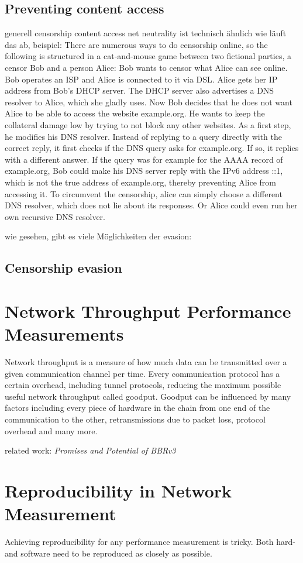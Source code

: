 \subsection{Preventing content access}
generell censorship
content access
net neutrality
ist technisch ähnlich
wie läuft das ab, beispiel:
There are numerous ways to do censorship online, so the following is structured in a cat-and-mouse game between two fictional parties, a censor Bob and a person Alice:
Bob wants to censor what Alice can see online.
Bob operates an ISP and Alice is connected to it via DSL. Alice gets her IP address from Bob's DHCP server.
The DHCP server also advertises a DNS resolver to Alice, which she gladly uses.
Now Bob decides that he does not want Alice to be able to access the website example.org.
He wants to keep the collateral damage low by trying to not block any other websites.
As a first step, he modifies his DNS resolver.
Instead of replying to a query directly with the correct reply, it first checks if the DNS query asks for example.org.
If so, it replies with a different answer.
If the query was for example for the AAAA record of example.org, Bob could make his DNS server reply with the IPv6 address ::1, which is not the true address of example.org, thereby preventing Alice from accessing it.
To circumvent the censorship, alice can simply choose a different DNS resolver, which does not lie about its responses.
Or Alice could even run her own recursive DNS resolver.


wie gesehen, gibt es viele Möglichkeiten der evasion:

\subsection{Censorship evasion}

\section{Network Throughput Performance Measurements}
Network throughput is a measure of how much data can be transmitted over a given communication channel per time.
Every communication protocol has a certain overhead, including tunnel protocols, reducing the maximum possible useful network throughput called goodput.
Goodput can be influenced by many factors including every piece of hardware in the chain from one end of the communication to the other, retransmissions due to packet loss, protocol overhead and many more.

related work: \textit{Promises and Potential of BBRv3} \cite{Promises-and-Potential-of-BBRv3}

\section{Reproducibility in Network Measurement}
Achieving reproducibility for any performance measurement is tricky. Both hard- and software need to be reproduced as closely as possible.
